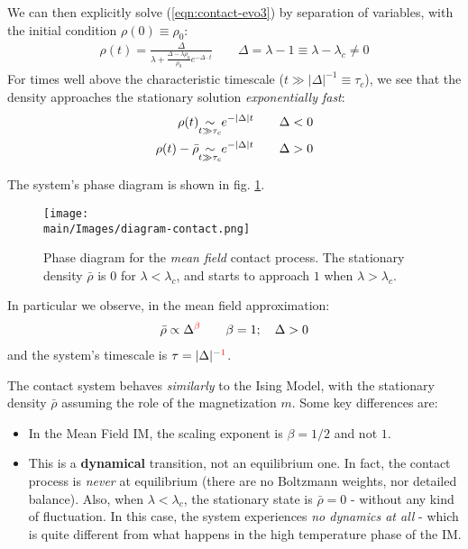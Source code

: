 \documentclass[../../main.tex]{subfiles}
\begin{document}
We can then explicitly solve (\ref{eqn:contact-evo3}) by separation of variables, with the initial condition $\rho(0) \equiv \rho_0$:
\begin{align*}
    \rho(t) = \frac{\Delta}{\lambda + \frac{\Delta - \lambda \rho_0}{\rho_0} e^{- \Delta\cdot  t}} \qquad \Delta = \lambda - 1 \equiv \lambda - \lambda_c \neq 0
\end{align*}
For times well above the characteristic timescale ($t \gg |\Delta|^{-1} \equiv \tau_c$), we see that the density approaches the stationary solution \textit{exponentially fast}:
\begin{align*}
    \rho(t) \> &\underset{\mathclap{t \gg \tau_c}}{\sim}  \> e^{-|\Delta| t} \qquad \Delta < 0\\
    \rho(t) - \bar{\rho} \> &\underset{\mathclap{t \gg \tau_c}}{\sim}  \> e^{-|\Delta| t} \qquad \Delta > 0
\end{align*} 


The system's phase diagram is shown in fig. \ref{fig:diagram-contact}. 

\begin{figure}[H]
    \centering
    \texttt{[image: \\main/Images/diagram-contact.png]}
    \caption{Phase diagram for the \textit{mean field} contact process. The stationary density $\bar{\rho}$ is $0$ for $\lambda < \lambda_c$, and starts to approach $1$ when $\lambda > \lambda_c$.}
    \label{fig:diagram-contact}
\end{figure}

In particular we observe, in the mean field approximation:
\begin{align*}
    \bar{\rho} \propto \Delta^{\textcolor{Red}{\beta}} \qquad \beta = 1; \quad \Delta > 0 
\end{align*}
and the system's timescale is $\tau = |\Delta|^{-\textcolor{Red}{1}}$.

\medskip

The contact system behaves \textit{similarly} to the Ising Model, with the stationary density $\bar{\rho}$ assuming the role of the magnetization $m$. Some key differences are:
\begin{itemize}
    \item In the Mean Field IM, the scaling exponent is $\beta = 1/2$ and not $1$.
    \item This is a \textbf{dynamical} transition, not an equilibrium one. In fact, the contact process is \textit{never} at equilibrium (there are no Boltzmann weights, nor detailed balance). Also, when $\lambda < \lambda_c$, the stationary state is $\bar{\rho} = 0$ - without any kind of fluctuation. In this case, the system experiences \textit{no dynamics at all} - which is quite different from what happens in the high temperature phase of the IM.   
\end{itemize}
 
\end{document}
